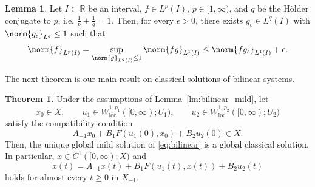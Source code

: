 \documentclass{cocv}
\newcommand{\RR}{\mathbb R}
\DeclareMathOperator{\loc}{loc}
\theoremstyle{definition}
\newtheorem{theorem}{Theorem}
\newtheorem{lemma}{Lemma}
\begin{document}
\begin{lemma}\label{lem:equiv_Lp_norm}
    Let $I \subset \RR$ be an interval, $f \in L^p(I)$, $p \in [1,\infty)$, and $q$ be the H\"older conjugate to $p$, i.e. $\frac{1}{p} + \frac{1}{q}=1$. Then, for every $\epsilon>0$, there exists $g_\epsilon \in L^q(I)$ with $\norm{g_\epsilon}_{L^q} \leq 1$ such that
    \begin{equation*}
        \norm{f}_{L^p(I)} = \sup_{\norm{g}_{L^q(I)} \leq 1} \norm{fg}_{L^1(I)} \le \norm{fg_\epsilon}_{L^1(I)} + \epsilon. 
    \end{equation*}
\end{lemma}
The next theorem is our main result on classical solutions of bilinear systems.
\begin{theorem}\label{thm:classical_solutions}
Under the assumptions of Lemma~\ref{lm:bilinear_mild}, let
\[
    x_0\in X,\qquad
    u_1\in W^{1,p_1}_{\loc}([0,\infty);U_1),\qquad
    u_2\in W^{1,p_2}_{\loc}([0,\infty);U_2)
\]
satisfy the compatibility condition
\[
    A_{-1}x_0+B_1F(u_1(0),x_0)+B_2u_2(0)\in X .
\]
Then, the unique global mild solution of \eqref{eq:bilinear} is a global
classical solution. In particular, $x\in C^1([0,\infty);X)$ and
\[
    \dot x(t)
    =
    A_{-1}x(t)+B_1F(u_1(t),x(t))+B_2u_2(t)
\]
holds for almost every $t\ge0$ in $X_{-1}$.
\end{theorem}
\end{document}
